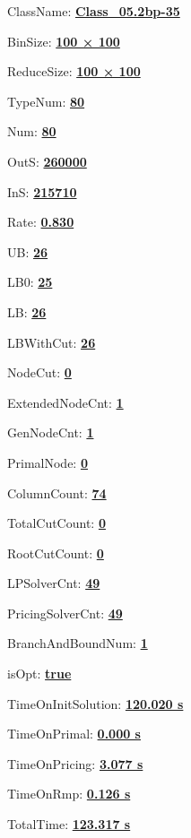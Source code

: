 \documentclass[11pt]{article}
\begin{document}
\pagestyle{empty}


ClassName: \underline{\textbf{Class_05.2bp-35}}
\par
BinSize: \underline{\textbf{100 × 100}}
\par
ReduceSize: \underline{\textbf{100 × 100}}
\par
TypeNum: \underline{\textbf{80}}
\par
Num: \underline{\textbf{80}}
\par
OutS: \underline{\textbf{260000}}
\par
InS: \underline{\textbf{215710}}
\par
Rate: \underline{\textbf{0.830}}
\par
UB: \underline{\textbf{26}}
\par
LB0: \underline{\textbf{25}}
\par
LB: \underline{\textbf{26}}
\par
LBWithCut: \underline{\textbf{26}}
\par
NodeCut: \underline{\textbf{0}}
\par
ExtendedNodeCnt: \underline{\textbf{1}}
\par
GenNodeCnt: \underline{\textbf{1}}
\par
PrimalNode: \underline{\textbf{0}}
\par
ColumnCount: \underline{\textbf{74}}
\par
TotalCutCount: \underline{\textbf{0}}
\par
RootCutCount: \underline{\textbf{0}}
\par
LPSolverCnt: \underline{\textbf{49}}
\par
PricingSolverCnt: \underline{\textbf{49}}
\par
BranchAndBoundNum: \underline{\textbf{1}}
\par
isOpt: \underline{\textbf{true}}
\par
TimeOnInitSolution: \underline{\textbf{120.020 s}}
\par
TimeOnPrimal: \underline{\textbf{0.000 s}}
\par
TimeOnPricing: \underline{\textbf{3.077 s}}
\par
TimeOnRmp: \underline{\textbf{0.126 s}}
\par
TotalTime: \underline{\textbf{123.317 s}}
\par
\newpage


\end{document}

